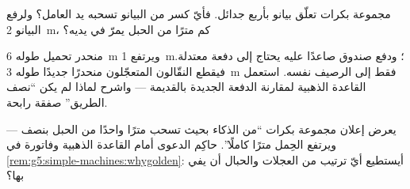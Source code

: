 \begin{exercise}[$\star\star$]\label{exo:g5:simple-machines:9}
مجموعة بكرات تعلّق بيانو بأربع جدائل. فأيّ كسر من  البيانو
تسحبه يد العامل؟ ولرفع البيانو \qty{2}{m}، كم مترًا من الحبل
يمرّ في يديه؟
\end{exercise}

\begin{exercise}[$\star\star$]\label{exo:g5:simple-machines:10}
منحدر تحميل طوله \qty{6}{m} ويرتفع \qty{1}{m}؛ ودفع صندوق صاعدًا
عليه يحتاج إلى دفعة معتدلة. فيقطع النقّالون المتعجّلون منحدرًا
جديدًا طوله \qty{3}{m} فقط إلى الرصيف نفسه. استعمل القاعدة
الذهبية لمقارنة الدفعة الجديدة بالقديمة --- واشرح لماذا لم يكن
``نصف الطريق'' صفقة رابحة.
\end{exercise}

\begin{exercise}[$\star\star$]\label{exo:g5:simple-machines:11}
يعرض إعلان مجموعة بكرات ``من الذكاء بحيث تسحب مترًا واحدًا من
الحبل بنصف  --- ويرتفع الحِمل مترًا كاملًا''. حاكِم الدعوى
أمام القاعدة الذهبية وفاتورة  في
\cref{rem:g5:simple-machines:whygolden}: أيستطيع أيّ ترتيب من
العجلات والحبال أن يفي بها؟
\end{exercise}
